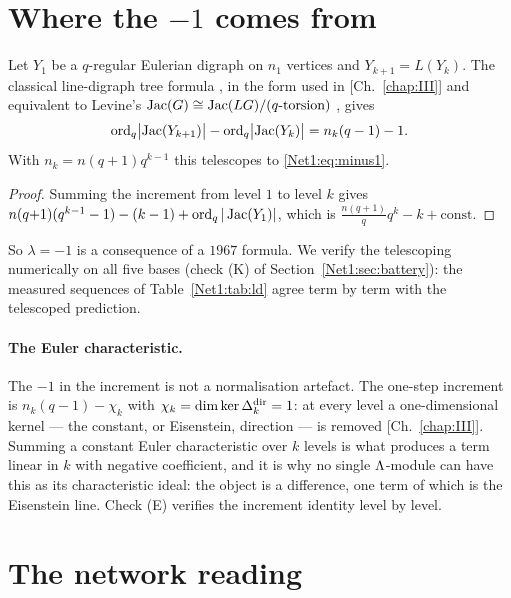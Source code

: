 \section{\texorpdfstring{Where the $-1$ comes from}{Where the -1 comes from}}\label{Net1:sec:where}

\begin{proposition}\label{Net1:prop:telescope}
Let $Y_1$ be a $q$-regular Eulerian digraph on $n_1$ vertices and $Y_{k+1}=L(Y_k)$. The
classical line-digraph tree formula \cite{Knuth67}, in the form used in
{\rm[Ch.~\ref{chap:III}]} and equivalent to Levine's $\operatorname{Jac}(G)\cong\operatorname{Jac}(LG)/(\text{$q$-torsion})$
{\rm\cite{Levine11}}, gives
\[
\operatorname{ord}_q\bigl|\operatorname{Jac}(Y_{k+1})\bigr|-\operatorname{ord}_q\bigl|\operatorname{Jac}(Y_k)\bigr|=n_k(q-1)-1 .
\]
With $n_k=n(q{+}1)q^{k-1}$ this telescopes to \eqref{Net1:eq:minus1}.
\end{proposition}

\begin{proof}
Summing the increment from level $1$ to level $k$ gives
$n(q{+}1)(q^{k-1}-1)-(k-1)+\operatorname{ord}_q|\operatorname{Jac}(Y_1)|$, which is
$\frac{n(q+1)}{q}q^{k}-k+\text{const}$.
\end{proof}

So $\lambda=-1$ is a consequence of a $1967$ formula. We verify the telescoping numerically
on all five bases (check (K) of Section~\ref{Net1:sec:battery}): the measured sequences of
Table~\ref{Net1:tab:ld} agree term by term with the telescoped prediction.

\paragraph{The Euler characteristic.}
The $-1$ in the increment is not a normalisation artefact. The one-step increment is
$n_k(q-1)-\chi_k$ with $\chi_k=\dim\ker\Delta^{\rm dir}_k=1$: at every level a
one-dimensional kernel --- the constant, or Eisenstein, direction --- is removed
[Ch.~\ref{chap:III}]. Summing a constant Euler characteristic over $k$ levels is what produces
a term linear in $k$ with negative coefficient, and it is why no single $\Lambda$-module can
have this as its characteristic ideal: the object is a difference, one term of which is the
Eisenstein line. Check (E) verifies the increment identity level by level.

\section{The network reading}\label{Net1:sec:net}

